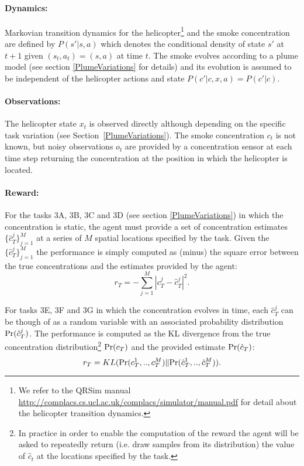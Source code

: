\documentclass[a4paper,11pt]{report}
\newcommand{\sname}{QRSim\xspace}
\newcommand{\webman}{\url{http://complacs.cs.ucl.ac.uk/complacs/simulator/manual.pdf}\xspace}
\newcommand{\pr}{{\rm Pr}}
\begin{document}
\paragraph{Dynamics:} Markovian transition dynamics for the helicopter\footnote{We refer to the \sname manual \webman for detail about the helicopter transition dynamics.} and the smoke concentration are defined by $P(s'|s,a)$ which denotes the conditional density of state $s'$ at $t+1$ given $(s_t,a_t) = (s,a)$ at time $t$. The smoke evolves according to a plume model (see section \ref{PlumeVariations} for details) and its evolution is assumed to be independent of the helicopter actions and state  $P(c'|c,x,a)=P(c'|c)$.

\paragraph{Observations:} The helicopter state $x_t$ is observed directly although depending on the specific task variation (see Section~\ref{PlumeVariations}). 
The smoke concentration $c_t$ is not known, but noisy observations $o_t$ are provided by a concentration sensor at each time step returning the concentration at the position in which the helicopter is located.

\paragraph{Reward:} 
For the tasks 3A, 3B, 3C and 3D (see section \ref{PlumeVariations}) in which the concentration is static, the agent must provide a set of concentration estimates $\{\hat c^j_T\}^M_{j=1}$ at a series of $M$ spatial locations specified by the task. 
Given the $\{\hat c^j_T\}^M_{j=1}$ the performance is simply computed as (minus) the square error between the true concentrations and the estimates provided by the agent:
$$
r_T = - \sum^M_{j=1} | c^j_T - \hat{c}^j_T |^2 .
$$

For tasks 3E, 3F and 3G in which the concentration evolves in time, each $\hat c^j_T$ can be though of as a random variable with an associated probability distribution $\pr(\hat c^j_T)$.
The performance is computed as the KL divergence from the true concentration distribution\footnote{In practice in order to enable the computation of the reward the agent will be asked to repeatedly return (i.e. draw samples from its distribution) the value of $\hat c_t$ at the locations specified by the task.} $\pr(c_T)$ and the provided estimate $\pr(\hat c_T)$:
$$
r_T = KL(\pr(c^1_T,..,c^M_T) \|{\pr}(\hat c^1_T,..,\hat c^M_T)).
$$
\end{document}

